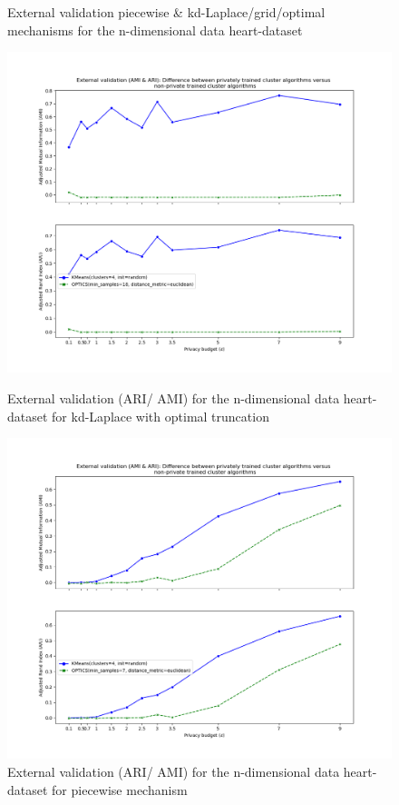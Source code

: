 \begin{figure}[H]
    \caption{External validation piecewise \& kd-Laplace/grid/optimal mechanisms for the n-dimensional data heart-dataset}
    \centering
    \begin{minipage}[c]{0.60\textwidth}
        \includegraphics[width=1\textwidth]{Results/nd-laplace-optimal-truncated/heart-dataset/ami-and-ari.png}
        \caption{External validation (ARI/ AMI) for the n-dimensional data heart-dataset for kd-Laplace with optimal truncation}
        \label{fig:external-validation-heart-dataset_comparison_nd-laplace}
    \end{minipage}
    \begin{minipage}[c]{0.60\textwidth}
        \includegraphics[width=1\textwidth]{Results/nd-piecewise/heart-dataset/ami-and-ari.png}
        \caption{External validation (ARI/ AMI) for the n-dimensional data heart-dataset for piecewise mechanism}
        \label{fig:external-validation-heart-dataset_comparison_nd-piecewise}
    \end{minipage}
\end{figure}
